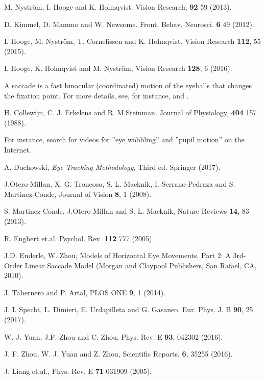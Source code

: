 \documentclass[prl]{revtex4}
\begin{document}
\begin{thebibliography}{99}

 M. Nystr\"om, I. Hooge and K. Holmqvist. Vision Research, {\bf 92} 59 (2013).

 D. Kimmel, D. Mammo and W. Newsome. Front. Behav. Neurosci. {\bf 6} 49 (2012).

 I. Hooge, M. Nystr\"om, T. Cornelissen and K. Holmqvist. Vision Research {\bf 112}, 55 (2015).

 I. Hooge, K. Holmqvist and M. Nystr\"om, Vision Research {\bf 128}, 6 (2016).

 A saccade is a fast binocular (coordinated) motion of the eyeballs that changes the fixation point. For more details, see, for instance, \cite{saccade} and \cite{Duch}.

 H. Collewijn, C. J. Erkelens and R. M.Steinman. Journal of Physiology, {\bf 404} 157 (1988).

 For instance, search for videos for ''eye wobbling'' and ''pupil motion'' on the Internet.

 A. Duchowski, {\em Eye Tracking Methodology}, Third ed. Springer (2017).

 J.Otero-Millan, X. G. Troncoso, S. L. Macknik, I. Serrano-Pedraza and S. Martinez-Conde, Journal of Vision \textbf{8}, 1 (2008).

 S. Martinez-Conde, J.Otero-Millan and S. L. Macknik, Nature Reviews \textbf{14}, 83 (2013).

 R. Engbert et.al. Psychol. Rev. {\bf 112} 777 (2005).

 J.D. Enderle, W. Zhou, Models of Horizontal Eye Movements. Part 2: A 3rd-Order Linear Saccade Model (Morgan and Claypool Publishers, San Rafael, CA, 2010).

 J. Tabernero and P. Artal, PLOS ONE \textbf{9}, 1 (2014).

 J. I. Specht, L. Dimieri, E. Urdapilleta and G. Gasaneo, Eur. Phys. J. B  \textbf{90}, 25 (2017).

 W. J. Yuan, J.F. Zhou and C. Zhou, Phys. Rev. E {\bf 93}, 042302 (2016).

 J. F. Zhou, W. J. Yuan and Z. Zhou, Scientific Reports, {\bf 6}, 35255 (2016).

 J. Liang et.al., Phys. Rev. E {\bf 71} 031909 (2005).


\end{thebibliography}
\end{document}
